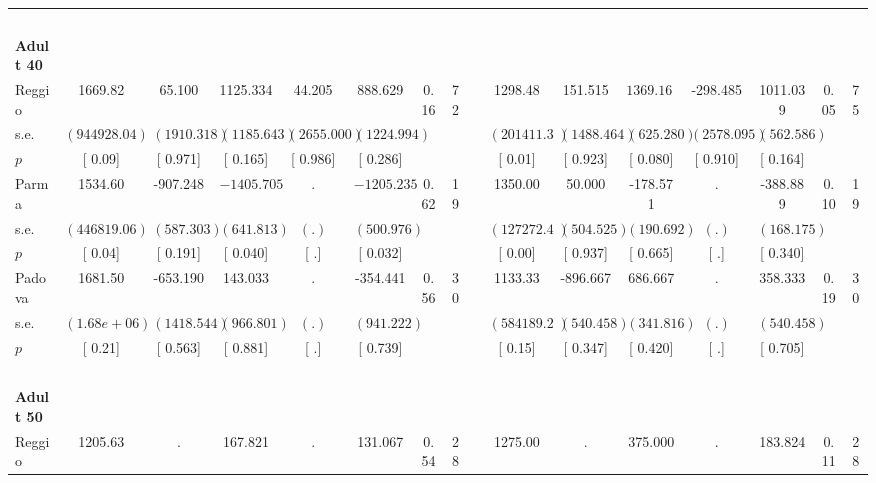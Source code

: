 \begin{longtable}{L{8em} c c c c c c c p{1em} c c c c c c c}
~\\[1em]
\quad \quad \textbf{Adult 40} & & & & & & & & & & & & & & & \\* 
\quad \quad \quad Reggio& 1669.82 &    65.100 &  1125.334 &    44.205 &   888.629 &      0.16 &        72 & & 1298.48 &   151.515 & $ \mathbf{ 1369.162}$ &  -298.485 &  1011.039 &      0.05 &        75  \\*
\quad \quad \quad \quad s.e.& $ (944928.04)$ & $ ( 1910.318)$ & $ ( 1185.643)$ & $ ( 2655.000)$ & $ ( 1224.994)$ & & & & $ (201411.35)$ & $ ( 1488.464)$ & $ (  625.280)$ & $ ( 2578.095)$ & $ (  562.586)$ & &  \\*
\quad \quad \quad \quad $ p$ & [     0.09] & [    0.971] & [    0.165] & [    0.986] & [    0.286] & & & & [     0.01] & [    0.923] & [    0.080] & [    0.910] & [    0.164] & &  \\[1em]
\quad \quad \quad Parma& 1534.60 &  -907.248 & $ \mathbf{-1405.705}$ &         . & $ \mathbf{-1205.235}$ &      0.62 &        19 & & 1350.00 &    50.000 &  -178.571 &         . &  -388.889 &      0.10 &        19  \\*
\quad \quad \quad \quad s.e.& $ (446819.06)$ & $ (  587.303)$ & $ (  641.813)$ & $ (        .)$ & $ (  500.976)$ & & & & $ (127272.49)$ & $ (  504.525)$ & $ (  190.692)$ & $ (        .)$ & $ (  168.175)$ & &  \\*
\quad \quad \quad \quad $ p$ & [     0.04] & [    0.191] & [    0.040] & [        .] & [    0.032] & & & & [     0.00] & [    0.937] & [    0.665] & [        .] & [    0.340] & &  \\[1em]
\quad \quad \quad Padova& 1681.50 &  -653.190 &   143.033 &         . &  -354.441 &      0.56 &        30 & & 1133.33 &  -896.667 &   686.667 &         . &   358.333 &      0.19 &        30  \\*
\quad \quad \quad \quad s.e.& $ ( 1.68e+06)$ & $ ( 1418.544)$ & $ (  966.801)$ & $ (        .)$ & $ (  941.222)$ & & & & $ (584189.27)$ & $ (  540.458)$ & $ (  341.816)$ & $ (        .)$ & $ (  540.458)$ & &  \\*
\quad \quad \quad \quad $ p$ & [     0.21] & [    0.563] & [    0.881] & [        .] & [    0.739] & & & & [     0.15] & [    0.347] & [    0.420] & [        .] & [    0.705] & &  \\[1em]
~\\[1em]
\quad \quad \textbf{Adult 50} & & & & & & & & & & & & & & & \\* 
\quad \quad \quad Reggio& 1205.63 &         . &   167.821 &         . &   131.067 &      0.54 &        28 & & 1275.00 &         . &   375.000 &         . &   183.824 &      0.11 &        28  \\*

\end{longtable}
